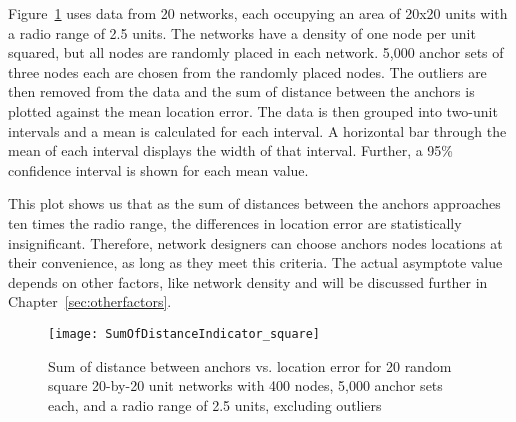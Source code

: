 Figure~\ref{fig:sumOfDistanceIndicator} uses data from 20 networks, each occupying an area of 20x20 units with a radio range of 2.5 units.  The networks have a density of one node per unit squared, but all nodes are randomly placed in each network.  5,000 anchor sets of three nodes each are chosen from the randomly placed nodes.  The outliers are then removed from the data and the sum of distance between the anchors is plotted against the mean location error.  The data is then grouped into two-unit intervals and a mean is calculated for each interval.  A horizontal bar through the mean of each interval displays the width of that interval.  Further, a 95\% confidence interval is shown for each mean value.  

This plot shows us that as the sum of distances between the anchors approaches ten times the radio range, the differences in location error are statistically insignificant.  Therefore, network designers can choose anchors nodes locations at their convenience, as long as they meet this criteria.  The actual asymptote value depends on other factors, like network density and will be discussed further in Chapter~\ref{sec:otherfactors}.

\begin{figure}
  \centering
	\texttt{[image: SumOfDistanceIndicator\_square]}
	\caption[Sum of distance between anchors vs. location error]{Sum of distance between anchors vs. location error for 20 random square 20-by-20 unit networks with 400 nodes, 5,000 anchor sets each, and a radio range of 2.5 units, excluding outliers}
	\label{fig:sumOfDistanceIndicator}
\end{figure}


